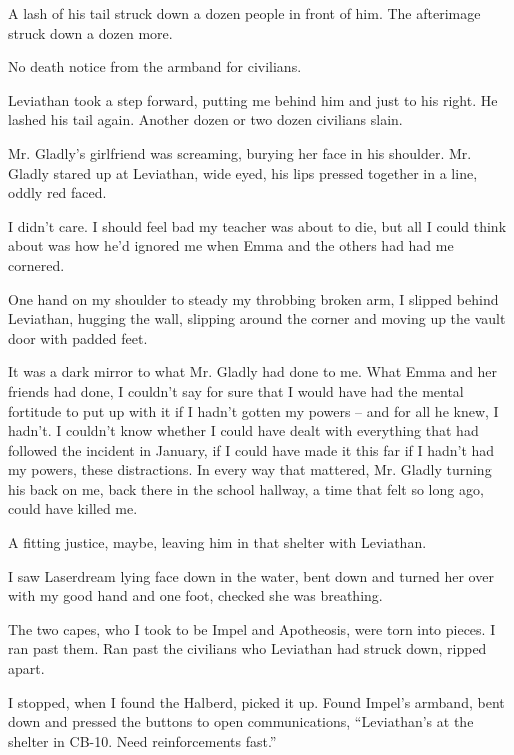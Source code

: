 A lash of his tail struck down a dozen people in front of him.  The afterimage struck down a dozen more.



No death notice from the armband for civilians.



Leviathan took a step forward, putting me behind him and just to his right.  He lashed his tail again.  Another dozen or two dozen civilians slain.



Mr. Gladly's girlfriend was screaming, burying her face in his shoulder.  Mr. Gladly stared up at Leviathan, wide eyed, his lips pressed together in a line, oddly red faced.



I didn't care.  I should feel bad my teacher was about to die, but all I could think about was how he'd ignored me when Emma and the others had had me cornered.



One hand on my shoulder to steady my throbbing broken arm, I slipped behind Leviathan, hugging the wall, slipping around the corner and moving up the vault door with padded feet.



It was a dark mirror to what Mr. Gladly had done to me.  What Emma and her friends had done, I couldn't say for sure that I would have had the mental fortitude to put up with it if I hadn't gotten my powers – and for all he knew, I hadn't.  I couldn't know whether I could have dealt with everything that had followed the incident in January, if I could have made it this far if I hadn't had my powers, these distractions.  In every way that mattered, Mr. Gladly turning his back on me, back there in the school hallway, a time that felt so long ago, could have killed me.



A fitting justice, maybe, leaving him in that shelter with Leviathan.



I saw Laserdream lying face down in the water, bent down and turned her over with my good hand and one foot, checked she was breathing.



The two capes, who I took to be Impel and Apotheosis, were torn into pieces.  I ran past them.  Ran past the civilians who Leviathan had struck down, ripped apart.



I stopped, when I found the Halberd, picked it up.  Found Impel's armband, bent down and pressed the buttons to open communications, ``Leviathan's at the shelter in CB-10.  Need reinforcements fast.''



